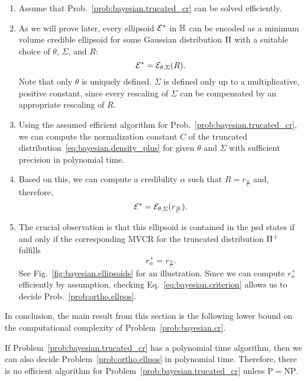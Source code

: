 \begin{enumerate}
  \item Assume that Prob.~\ref{prob:bayesian.trucated_cr} can be solved efficiently.

  \item As we will prove later, every ellipsoid $\mathcal{E}^*$ in $\mathbb{H}$ can be encoded as a minimum volume credible ellipsoid for some Gaussian distribution $\Pi$ with a suitable choice of $\theta$, $\Sigma$, and $R$:
  \begin{equation}
    \mathcal{E}^* = \mathcal{E}_{\theta,\Sigma}(R).
  \end{equation}
  Note that only $\theta$ is uniquely defined.
  $\Sigma$ is defined only up to a multiplicative, positive constant, since every rescaling of $\Sigma$ can be compensated by an appropriate rescaling of $R$.

  \item  Using the assumed efficient algorithm for Prob.~\ref{prob:bayesian.trucated_cr}, we can compute the normalization constant $C$ of the truncated distribution~\eqref{eq:bayesian.density_plus} for given $\theta$ and $\Sigma$ with sufficient precision in polynomial time.

  \item Based on this, we can compute a credibility $\alpha$ such that $R = r_\frac{\alpha}{C}$ and, therefore,
  \begin{equation}
    \mathcal{E}^* = \mathcal{E}_{\theta,\Sigma}(r_\frac{\alpha}{C}).
  \end{equation}

  \item The crucial observation is that this ellipsoid is contained in the psd states if and only if the corresponding MVCR for the truncated distribution $\Pi^+$ fulfills
  \begin{equation}
    \label{eq:bayesian.criterion}
    r^+_{\alpha} = r_\frac{\alpha}{C}.
  \end{equation}
  See Fig.~\ref{fig:bayesian.ellipsoids} for an illustration.
  Since we can compute $r^+_{\alpha}$ efficiently by assumption, checking Eq.~\eqref{eq:bayesian.criterion} allows us to decide Prob.~\ref{prob:ortho.ellpos}.
\end{enumerate}

In conclusion, the main result from this section is the following lower bound on the computational complexity of Problem~\ref{prob:bayesian.cr}.
\begin{theorem}\label{thm:bayesian.hardness}
  If Problem~\ref{prob:bayesian.trucated_cr} has a polynomial time algorithm, then we can also decide Problem~\ref{prob:ortho.ellpos} in polynomial time.
  Therefore, there is no efficient algorithm for Problem~\ref{prob:bayesian.trucated_cr} unless $\mathrm{P} = \mathrm{NP}$.
\end{theorem}

